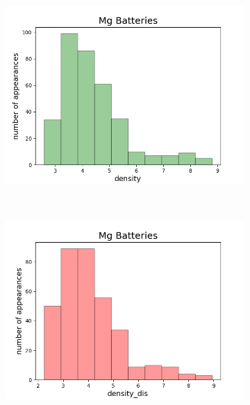 \begin{figure}[h]
\begin{subfigure}{0.2\textwidth}
     \end{subfigure}
          ~ 
               \begin{subfigure}{0.2\textwidth}
         \centering
         \includegraphics[width=\linewidth]{result/figures/distribution/Mg_distrof_density.png}
         
     \end{subfigure}
          ~ 
     \begin{subfigure}{0.2\textwidth}
         \centering
         \includegraphics[width=\linewidth]{result/figures/distribution/Mg_distrof_density_dis.png}
         

\end{subfigure}
\end{figure}
